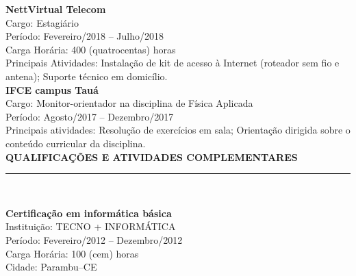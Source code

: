 \documentclass[a4paper,12pt]{article}
\begin{document}
\textbf{NettVirtual Telecom}\\

Cargo: Estagiário\\
Período: Fevereiro/2018 -- Julho/2018\\
Carga Horária: 400 (quatrocentas) horas\\
Principais Atividades: Instalação de kit de acesso à Internet
(roteador sem fio e antena); Suporte técnico em domicílio.\\

\textbf{IFCE campus Tauá}\\

Cargo: Monitor-orientador na disciplina de Física Aplicada\\
Período: Agosto/2017 -- Dezembro/2017\\
Principais atividades: Resolução de exercícios em sala; Orientação dirigida
sobre o conteúdo curricular da disciplina.\\


\textbf{QUALIFICAÇÕES E ATIVIDADES COMPLEMENTARES}\par
\vspace*{-2.0mm}
\rule{\linewidth}{1.25pt}\\
\vspace{-2.0mm}

\textbf{\checkmark\hspace{1mm}Certificação em informática básica}\\

Instituição: TECNO + INFORMÁTICA\\
Período: Fevereiro/2012 -- Dezembro/2012\\
Carga Horária: 100 (cem) horas\\
Cidade: Parambu--CE
\end{document}
